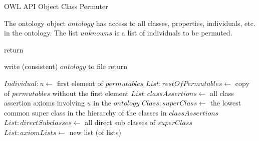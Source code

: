 \documentclass{article}
\begin{document}





\begin{algorithm}
\caption{OWL API Object Class Permuter}
\begin{algorithmic}[0]

\State The ontology object $ontology$ has access to all classes, properties, individuals, etc. in the ontology.
\State The list $unknowns$ is a list of individuals to be permuted.
\State


		\State return
		\State
	\EndIf	

	
		\State write (consistent) $ontology$ to file
		\State return
		\State
	\EndIf

	\State $Individual:u \leftarrow$ first element of $permutables$
	\State $List:restOfPermutables \leftarrow$ copy of $permutables$ without the first element
	\State
	\State $List:classAssertions \leftarrow$ all class assertion axioms involving $u$ in the $ontology$
	\State $Class:superClass \leftarrow$ the lowest common super class in the hierarchy of the classes in $classAssertions$
	\State $List:directSubclasses \leftarrow$ all direct sub classes of $superClass$
	\State $List:axiomLists \leftarrow$ new list (of lists)
	\State
	

\end{algorithmic}
\end{algorithm}
\end{document}
